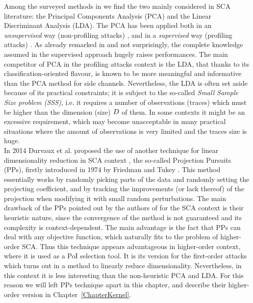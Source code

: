 Among the surveyed methods in \cite{cunningham2015linear} we find the two mainly considered in SCA literature: the Principal Components Analysis (PCA) and the Linear Discriminant Analysis (LDA). The PCA has been applied both in an {\em unsupervised} way (\ie non-profiling attacks) \cite{Batina2012,karsmakers2009side}, and in a {\em supervised} way (\ie profiling attacks) \cite{TAprincipal,choudaryefficient,choudary2014efficient,disassembler,Standaert2008}. As already remarked in \cite{disassembler} and not surprisingly, the complete knowledge assumed in the supervised approach hugely raises performances. The main competitor of PCA in the profiling attacks context is the LDA, that thanks to its classification-oriented flavour, is known to be more meaningful and informative \cite{lessIsMore,Standaert2008} than the PCA method  for side channels. Nevertheless, the LDA is often set aside because of its practical constraints; it is subject to the so-called {\em Small Sample Size problem (SSS)}, i.e. it requires a number of observations (traces) which must be higher than the dimension (size) $D$ of them. In some contexts it might be an excessive requirement, which may become unacceptable in many practical situations where the amount of observations is very limited and the traces size is huge.\\

In 2014 Durvaux et al. proposed the use of another technique for linear dimensionality reduction in SCA context \cite{PP}, the so-called Projection Pursuits (PPs), firstly introduced in 1974 by Friedman and Tukey \cite{friedman1974projection}. This method essentially works by randomly picking parts of the data and randomly setting the projecting coefficient, and
by tracking the improvements (or lack thereof) of the projection when modifying
it with small random perturbations. The main drawback of the PPs  pointed out by the authors of \cite{PP} for the SCA context is their heuristic nature,
since the convergence of the method is not guaranteed and its complexity is
context-dependent. The main advantage is the fact that
PPs can deal with any objective function, which naturally fits to the problem
of higher-order SCA. Thus this technique appears advantageous in higher-order context, where it is used as a PoI selection tool. It is its version for the first-order attacks  which turns out in a method to linearly reduce dimensionality. Nevertheless, in this context it is less interesting than the non-heuristic PCA and LDA. For this reason we will left PPs technique apart in this chapter, and describe their higher-order version in Chapter~\ref{ChapterKernel}.

